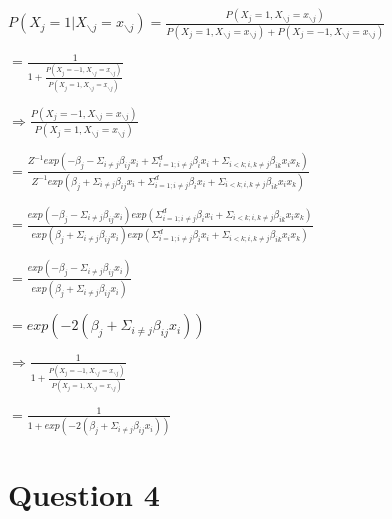 \documentclass[
]{article}
\begin{document}
\(P(X_j = 1 | X_{\backslash j} = x_{\backslash j}) = \frac{P(X_j = 1, X_{\backslash j} = x_{\backslash j})}{P(X_j = 1, X_{\backslash j} = x_{\backslash j}) + P(X_j = -1, X_{\backslash j} = x_{\backslash j})}\)

\(= \frac{1}{1 + \frac{P(X_j = -1, X_{\backslash j} = x_{\backslash j})}{P(X_j = 1, X_{\backslash j} = x_{\backslash j})}}\)

\(\Rightarrow \frac{P(X_j = -1, X_{\backslash j} = x_{\backslash j})}{P(X_j = 1, X_{\backslash j} = x_{\backslash j})}\)

\(= \frac{Z^{-1}exp(-\beta_j - \Sigma_{i \neq j}\beta_{ij}x_i+\Sigma_{i=1; i\neq j}^d\beta_ix_i + \Sigma_{i < k; i,k\neq j}\beta_{ik}x_ix_k)}{Z^{-1}exp(\beta_j + \Sigma_{i \neq j}\beta_{ij}x_i+\Sigma_{i=1; i\neq j}^d\beta_ix_i + \Sigma_{i < k; i,k\neq j}\beta_{ik}x_ix_k)}\)

\(= \frac{exp(-\beta_j - \Sigma_{i \neq j}\beta_{ij}x_i)exp(\Sigma_{i=1; i\neq j}^d\beta_ix_i + \Sigma_{i < k; i,k\neq j}\beta_{ik}x_ix_k)}{exp(\beta_j + \Sigma_{i \neq j}\beta_{ij}x_i)exp(\Sigma_{i=1; i\neq j}^d\beta_ix_i + \Sigma_{i < k; i,k\neq j}\beta_{ik}x_ix_k)}\)

\(= \frac{exp(-\beta_j - \Sigma_{i \neq j}\beta_{ij}x_i)}{exp(\beta_j + \Sigma_{i \neq j}\beta_{ij}x_i)}\)

\(= exp(-2(\beta_j + \Sigma_{i \neq j}\beta_{ij}x_i))\)

\(\Rightarrow \frac{1}{1 + \frac{P(X_j = -1, X_{\backslash j} = x_{\backslash j})}{P(X_j = 1, X_{\backslash j} = x_{\backslash j})}}\)

\(= \frac{1}{1 + exp(-2(\beta_j + \Sigma_{i \neq j}\beta_{ij}x_i))}\)

\hypertarget{question-4}{%
\section{Question 4}\label{question-4}}
\end{document}
